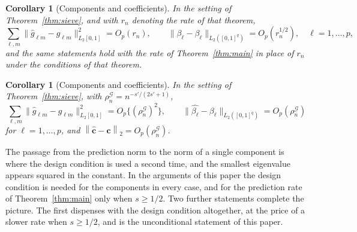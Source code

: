 \documentclass[12pt]{article} %
\newtheorem{corollary}{Corollary}
\theoremstyle{definition}
\theoremstyle{plain}
\newtheorem*{corollaryold}{Corollary}
\newcommand{\norm}[1]{\left\lVert #1 \right\rVert}
\newcommand{\cv}{\ell}
\newcommand{\md}{m}
\newcommand{\fcoef}[1]{\beta_{#1}}
\newcommand{\gcomp}[2]{g_{#1#2}}
\newcommand{\bc}{\mathbf{c}}
\newcommand{\chat}{\widehat{\mathbf{c}}}
\newcommand{\seff}{s'}
\newcommand{\rhoG}{\rho^{\mathcal{G}}_{n}}
\newcommand{\removedk}{\par\noindent[removed in k = 4]\par}
\begin{document}
{\color{gray}\removedk
\begin{corollaryold}[Components and coefficients]
In the setting of Theorem~\ref{thm:sieve}, and with $r_n$ denoting the rate of
that theorem,
\[
  \sum_{\cv,\md}\bigl\lVert\widehat{g}_{\cv\md}-\gcomp{\cv}{\md}
  \bigr\rVert_{L_2[0,1]}^{2} = O_p(r_n),
  \qquad
  \bigl\lVert\widehat{\fcoef{\cv}}-\fcoef{\cv}
  \bigr\rVert_{L_2([0,1]^{q})} = O_p(r_n^{1/2}),
  \quad \cv = 1,\dots,p,
\]
and the same statements hold with the rate of Theorem~\ref{thm:main} in place
of $r_n$ under the conditions of that theorem.
\end{corollaryold}
}
{\color{colR1}
\begin{corollary}[Components and coefficients]
\label{cor:components}
In the setting of Theorem~\ref{thm:sieve}, with
$\rhoG = n^{-\seff/(2\seff+1)}$,
\[
  \sum_{\cv,\md}\bigl\lVert\widehat{g}_{\cv\md}-\gcomp{\cv}{\md}
  \bigr\rVert_{L_2[0,1]}^{2} = O_p\bigl\{(\rhoG)^{2}\bigr\},
  \qquad
  \bigl\lVert\widehat{\fcoef{\cv}}-\fcoef{\cv}
  \bigr\rVert_{L_2([0,1]^{q})} = O_p(\rhoG)
\]
for $\cv = 1,\dots,p$, and $\norm{\chat - \bc}_{2} = O_p(\rhoG)$.
\end{corollary}
}

The passage from the prediction norm to the norm of a single component is
where the design condition is used a second time, and the smallest eigenvalue
appears squared in the constant. \textcolor{colR1}{In the arguments of this
paper the design condition is needed for the components in every case, and
for the prediction rate of Theorem~\ref{thm:main} only when $s \ge 1/2$.}
Two further statements complete the picture.
The first dispenses with the design condition altogether, at the price of a
slower rate \textcolor{colR1}{when $s \ge 1/2$}, and is the unconditional statement of this paper.
\end{document}
